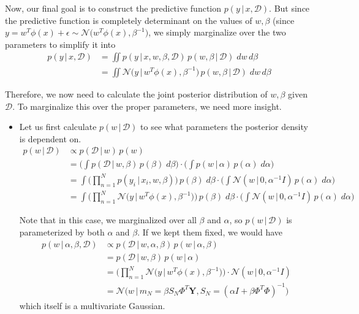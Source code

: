 \documentclass{article}
\begin{document}
    Now, our final goal is to construct the predictive function $p(y\,|\,x, \mathcal{D})$. But since the predictive function is completely determinant on the values of $w, \beta$ (since $y = w^T \phi(x) + \epsilon \sim \mathcal{N}\big( w^T \phi(x), \beta^{-1}\big)$, we simply marginalize over the two parameters to simplify it into
    \begin{align*}
      p(y\,|\,x, \mathcal{D}) & = \iint p(y\,|\, x, w, \beta, \mathcal{D}) \, p(w, \beta \,|\,\mathcal{D})\; dw\, d\beta \\
      & = \iint \mathcal{N}\big(y\,|\, w^T \phi(x), \beta^{-1}\big) \, p(w, \beta\,|\, \mathcal{D})\; dw\, d\beta
    \end{align*}

    Therefore, we now need to calculate the joint posterior distribution of $w, \beta$ given $\mathcal{D}$. To marginalize this over the proper parameters, we need more insight.
    \begin{itemize}
      \item Let us first calculate $p(w\,|\,\mathcal{D})$ to see what parameters the posterior density is dependent on.
      \begin{align*}
        p(w\,|\,\mathcal{D}) & \propto p(\mathcal{D} \,|\,w)\, p(w) \\
        & = \Bigg( \int p(\mathcal{D}\,|\,w, \beta) \, p( \beta) \; d\beta \Bigg) \cdot \Bigg( \int p(w\,|\,\alpha)\, p(\alpha)\; d\alpha \Bigg) \\
        & = \int \bigg( \prod_{n=1}^N p(y_i\,|\,x_i, w, \beta)\bigg)\, p(\beta) \; d\beta \cdot \Bigg( \int \mathcal{N}(w\,|\,0, \alpha^{-1} I)\, p(\alpha)\; d\alpha \Bigg) \\
        & = \int \bigg( \prod_{n=1}^N \mathcal{N}\big( y\,|\, w^T \phi(x), \beta^{-1} \big) \bigg)\, p(\beta) \; d\beta \cdot \Bigg( \int \mathcal{N}(w\,|\,0, \alpha^{-1} I)\, p(\alpha)\; d\alpha \Bigg)
      \end{align*}
      
      Note that in this case, we marginalized over all $\beta$ and $\alpha$, so $p(w\,|\,\mathcal{D})$ is parameterized by both $\alpha$ and $\beta$. If we kept them fixed, we would have
      \begin{align*}
        p(w\,|\,\alpha, \beta, \mathcal{D}) & \propto p(\mathcal{D}\,|\,w, \alpha, \beta) \, p(w\,|\,\alpha, \beta) \\
        & = p(\mathcal{D}\,|\,w, \beta) \, p(w\,|\,\alpha) \\
        & = \bigg( \prod_{n=1}^N \mathcal{N}\big( y\,|\, w^T \phi(x), \beta^{-1} \big) \bigg) \cdot \mathcal{N}(w\,|\,0, \alpha^{-1} I) \\
        & = \mathcal{N}\big( w\,|\, m_N = \beta S_N \Phi^T \mathbf{Y}, S_N = (\alpha I + \beta \Phi^T \Phi)^{-1} \big)
      \end{align*}
      which itself is a multivariate Gaussian.
    \end{itemize}
\end{document}
